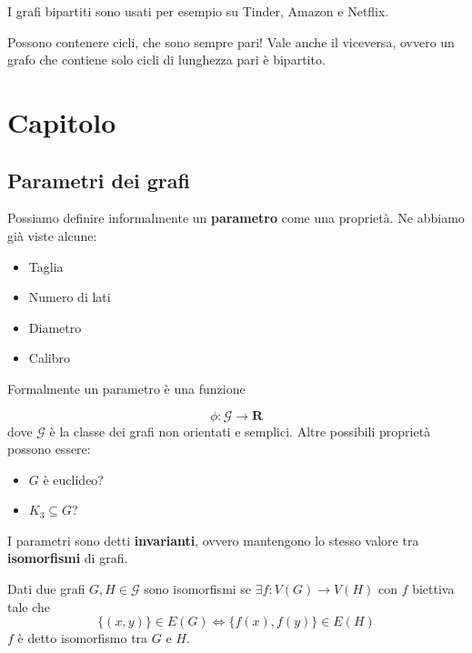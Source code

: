\documentclass[12pt]{report}
\begin{document}
\begin{exmp}
    I grafi bipartiti sono usati per esempio su Tinder, Amazon e Netflix.


    \noindent 
    Possono contenere cicli, che sono sempre pari! Vale anche il viceversa, ovvero un grafo che contiene solo cicli di lunghezza pari è bipartito.
\end{exmp}


\chapter{Capitolo}
\section{Parametri dei grafi}

Possiamo definire informalmente un \textbf{parametro} come una proprietà. Ne abbiamo già viste alcune: 

\begin{itemize}
    \item Taglia
    \item Numero di lati
    \item Diametro
    \item Calibro
\end{itemize}
Formalmente un parametro è una funzione 

$$\phi: \mathscr{G} \rightarrow \mathbf{R}$$
dove $\mathscr{G}$ è la classe dei grafi non orientati e semplici. Altre possibili proprietà possono essere:

\begin{itemize}
    \item $G$ è euclideo?
    \item $K_3 \subseteq G$?
\end{itemize}
I parametri sono detti \textbf{invarianti}, ovvero mantengono lo stesso valore tra \textbf{isomorfismi} di grafi. 
\begin{defi}
    Dati due grafi $G,H \in \mathscr{G}$ sono isomorfismi se $\exists f: V(G) \rightarrow V(H)$ con $f$ biettiva tale che  $$\{(x,y)\} \in E(G) \Longleftrightarrow \{f(x),f(y)\} \in E(H)$$
    $f$ è detto isomorfismo tra $G$ e $H$.
\end{defi}
\end{document}
